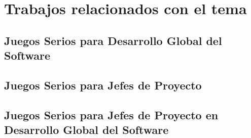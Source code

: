 \section{Trabajos relacionados con el tema}
\label{sec:TrabajosRelacionados}

\subsection{Juegos Serios para Desarrollo Global del Software}
\label{sec:JuegosSeriosDGS}

\subsection{Juegos Serios para Jefes de Proyecto}
\label{sec:JuegosSeriosJP}

\subsection{Juegos Serios para Jefes de Proyecto en Desarrollo Global del Software}
\label{sec:JuegosSeriosJPDGS}